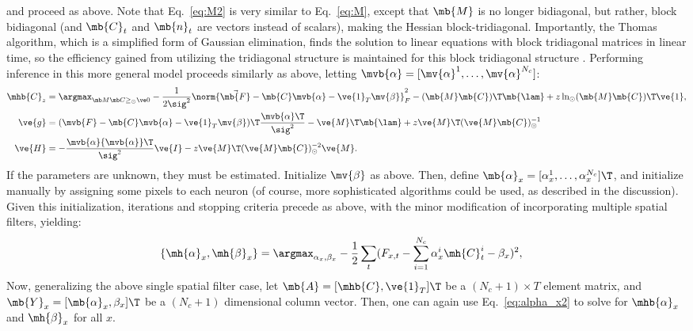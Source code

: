 \noindent and proceed as above.  Note that Eq.~\eqref{eq:M2} is very similar to Eq.~\eqref{eq:M}, except that $\mb{M}$ is no longer bidiagonal, but rather, block bidiagonal (and $\mb{C}_t$ and $\mb{n}_t$ are vectors instead of scalars), making the Hessian block-tridiagonal.  Importantly, the Thomas algorithm, which is a simplified form of Gaussian elimination, finds the solution to linear equations with block tridiagonal matrices in linear time, so the efficiency gained from utilizing the tridiagonal structure is maintained for this block tridiagonal structure \cite{Press92}.   Performing inference in this more general model proceeds similarly as above, letting $\mvb{\alpha}=[\mv{\alpha}^1, \ldots, \mv{\alpha}^{N_c}]$:
\begin{align} 
\mhb{C}_{\zzz} 
&= \az  -\frac{1}{2 \sig^2} \norm{\vec{\mb{F}} - \mb{C} \mvb{\alpha} - \ve{1}_T \mv{\beta}}_F^2 - (\mb{M} \mb{C} )\T \mb{\lam}  + \zzz \ln_\odot(\mb{M} \mb{C})\T\ve{1},  \label{eq:eta5}\\
\ve{g} &= (\mvb{F} - \mb{C} \mvb{\alpha} - \ve{1}_T \mv{\beta})\T\frac{{\mvb{\alpha}}\T}{\sig^2} - \ve{M}\T\mb{\lam} + \zzz \ve{M}\T (\ve{M} \mb{C})^{-1}_\odot \label{eq:g3} \\
\ve{H} &= -\frac{\mvb{\alpha} {\mvb{\alpha}}\T}{\sig^2} \ve{I} - \zzz \ve{M}\T (\ve{M} \mb{C})^{-2}_\odot \ve{M}. \label{eq:H3}
\end{align}
If the parameters are unknown, they must be estimated. Initialize $\mv{\beta}$ as above.  Then, define $\mb{\alpha}_x =[\alpha_x^1, \ldots, \alpha_x^{N_c}]\T$, and initialize manually by assigning some pixels to each neuron (of course, more sophisticated algorithms could be used, as described in the discussion).  Given this initialization, iterations and stopping criteria precede as above, with the minor modification of incorporating multiple spatial filters, yielding:
\begin{align}
\{\mh{\alpha}_x,\mh{\beta}_x\}	&= \argmax_{\alpha_x,\beta_x} -\frac{1}{2} \sum_t  (F_{x,t} - \sum_{i=1}^{N_c} \alpha^i_x \mh{C}^i_t - \beta_x)^2, \label{eq:alpha_x3}
\end{align}
Now, generalizing the above single spatial filter case, let $\mb{A}=[\mhb{C}, \ve{1}_T]\T$ be a $(N_c+1) \times T$ element matrix, and $\mb{Y}_x=[\mb{\alpha}_x, \beta_x]\T$ be a $(N_c+1)$ dimensional column vector. Then, one can again use Eq.~\eqref{eq:alpha_x2} to solve for $\mhb{\alpha}_x$ and $\mh{\beta}_x$ for all $x$.



